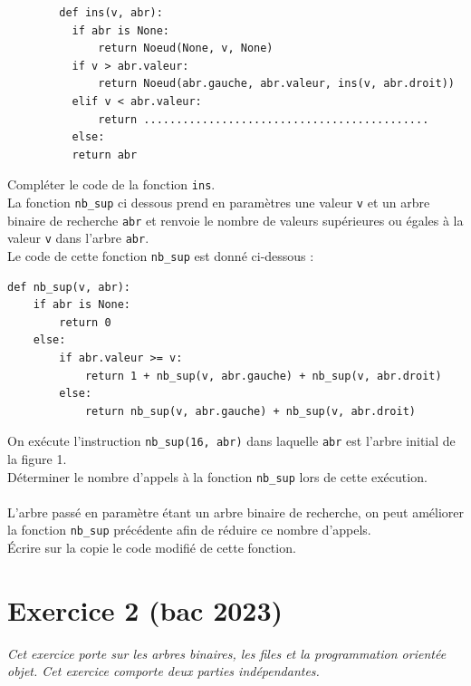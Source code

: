 \documentclass[a4paper,12pt,eval,firamath]{nsi}
\begin{document}
\begin{verbatim}
        def ins(v, abr):
          if abr is None:
              return Noeud(None, v, None)
          if v > abr.valeur:
              return Noeud(abr.gauche, abr.valeur, ins(v, abr.droit))
          elif v < abr.valeur:
              return ............................................
          else:
          return abr      
      \end{verbatim}

\question Compléter le code de la fonction \texttt{ins}.\\



La fonction \texttt{nb_sup} ci dessous prend en paramètres une valeur \texttt{v} et un arbre binaire de recherche \texttt{abr} et renvoie le nombre de valeurs supérieures ou égales à la valeur \texttt{v} dans l'arbre \texttt{abr}.\\
Le code de cette fonction \texttt{nb_sup} est donné ci-dessous :

\begin{verbatim}
def nb_sup(v, abr):
    if abr is None:
        return 0
    else:
        if abr.valeur >= v:
            return 1 + nb_sup(v, abr.gauche) + nb_sup(v, abr.droit)
        else:
            return nb_sup(v, abr.gauche) + nb_sup(v, abr.droit)
\end{verbatim}

On exécute l'instruction \texttt{nb_sup(16, abr)} dans laquelle \texttt{abr} est l'arbre initial de la figure 1.\\

\question Déterminer le nombre d'appels à la fonction \texttt{nb_sup} lors de cette exécution.\\

\\

L'arbre passé en paramètre étant un arbre binaire de recherche, on peut
améliorer la fonction \texttt{nb_sup} précédente afin de réduire ce nombre d'appels.\\

\question Écrire sur la copie le code modifié de cette fonction.\\



\section*{Exercice 2 \small (bac 2023)}
\resetquestion
\textit{Cet exercice porte sur les arbres binaires, les files et la programmation orientée objet.
      Cet exercice comporte deux parties indépendantes.}\\
\end{document}
